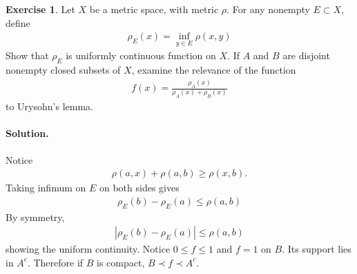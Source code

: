 \documentclass[10pt,a4paper]{book}
\theoremstyle{definition}
\newtheorem{exercise}{Exercise}[chapter]
\begin{document}
	\begin{exercise}
		Let $ X $ be a metric space, with metric $ \rho $. For any nonempty $ E \subset X $, define
		\begin{align*}
		\rho_E(x) = \inf_{y \in E} \rho(x, y)
		\end{align*}
		Show that $ \rho_E $ is uniformly continuous function on $ X $. If $ A $ and $ B $ are disjoint nonempty closed
		subsets of $ X $, examine the relevance of the function
		\begin{align*}
		f(x) = \frac{\rho_A(x)}{\rho_A(x) + \rho_B(x)}
		\end{align*}
		to Urysohn's lemma.

		\paragraph{Solution. }
		Notice
		\begin{align*}
		\rho(a, x) + \rho(a, b) \ge \rho(x, b).
		\end{align*}
		Taking infimum on $ E $ on both sides gives
		\begin{align*}
		\rho_E(b) - \rho_E(a) \le \rho(a, b)
		\end{align*}
		By symmetry,
		\begin{align*}
		|\rho_E(b) - \rho_E(a)| \le \rho(a, b)
		\end{align*}
		showing the uniform continuity. Notice $ 0 \le f \le 1 $ and $ f = 1 $ on $ B $. Its support lies in $ A^{c} $.
		Therefore if $ B $ is compact, $ B \prec f \prec A^c $.

	\end{exercise}
\end{document}
